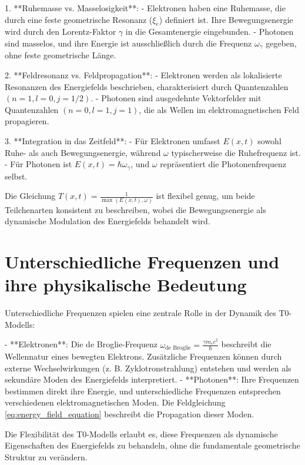\documentclass[12pt,a4paper]{article}
\begin{document}
	1. **Ruhemasse vs. Masselosigkeit**:
	- Elektronen haben eine Ruhemasse, die durch eine feste geometrische Resonanz (\(\xi_e\)) definiert ist. Ihre Bewegungsenergie wird durch den Lorentz-Faktor \(\gamma\) in die Gesamtenergie eingebunden.
	- Photonen sind masselos, und ihre Energie ist ausschließlich durch die Frequenz \(\omega_\gamma\) gegeben, ohne feste geometrische Länge.
	
	2. **Feldresonanz vs. Feldpropagation**:
	- Elektronen werden als lokalisierte Resonanzen des Energiefelds beschrieben, charakterisiert durch Quantenzahlen \((n=1, l=0, j=1/2)\).
	- Photonen sind ausgedehnte Vektorfelder mit Quantenzahlen \((n=0, l=1, j=1)\), die als Wellen im elektromagnetischen Feld propagieren.
	
	3. **Integration in das Zeitfeld**:
	- Für Elektronen umfasst \( E(x,t) \) sowohl Ruhe- als auch Bewegungsenergie, während \(\omega\) typischerweise die Ruhefrequenz ist.
	- Für Photonen ist \( E(x,t) = \hbar \omega_\gamma \), und \(\omega\) repräsentiert die Photonenfrequenz selbst.
	
	Die Gleichung \( T(x,t) = \frac{1}{\max(E(x,t), \omega)} \) ist flexibel genug, um beide Teilchenarten konsistent zu beschreiben, wobei die Bewegungsenergie als dynamische Modulation des Energiefelds behandelt wird.
	
	\section{Unterschiedliche Frequenzen und ihre physikalische Bedeutung}
	\label{sec:frequencies}
	
	Unterschiedliche Frequenzen spielen eine zentrale Rolle in der Dynamik des T0-Modells:
	
	- **Elektronen**: Die de Broglie-Frequenz \(\omega_{\text{de Broglie}} = \frac{\gamma m_e c^2}{\hbar}\) beschreibt die Wellennatur eines bewegten Elektrons. Zusätzliche Frequenzen können durch externe Wechselwirkungen (z. B. Zyklotronstrahlung) entstehen und werden als sekundäre Moden des Energiefelds interpretiert.
	- **Photonen**: Ihre Frequenzen bestimmen direkt ihre Energie, und unterschiedliche Frequenzen entsprechen verschiedenen elektromagnetischen Moden. Die Feldgleichung \eqref{eq:energy_field_equation} beschreibt die Propagation dieser Moden.
	
	Die Flexibilität des T0-Modells erlaubt es, diese Frequenzen als dynamische Eigenschaften des Energiefelds zu behandeln, ohne die fundamentale geometrische Struktur zu verändern.
	
\end{document}
